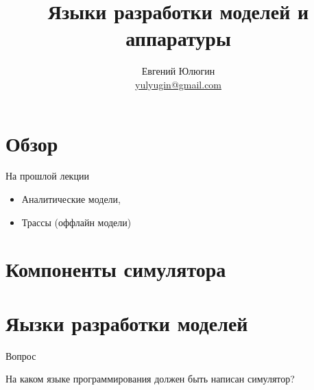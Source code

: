

\title{Языки разработки моделей и аппаратуры}
\author[Евгений Юлюгин]{Евгений Юлюгин \\ \small{\href{mailto:yulyugin@gmail.com}{yulyugin@gmail.com}}}



\begin{frame}
\titlepage
\end{frame}

\section{Обзор}

\begin{frame}
\tableofcontents
\end{frame} 

\begin{frame}{На прошлой лекции}

\begin{itemize}
  \item Аналитические модели,
  \item Трассы (оффлайн модели)
\end{itemize}

\end{frame}

\section{Компоненты симулятора}

\begin{frame}

\begin{figure}[htp]
\end{figure}

\end{frame}

\section{Яызки разработки моделей}

\begin{frame}{Вопрос}

На каком языке программирования должен быть написан симулятор?

\end{frame}

